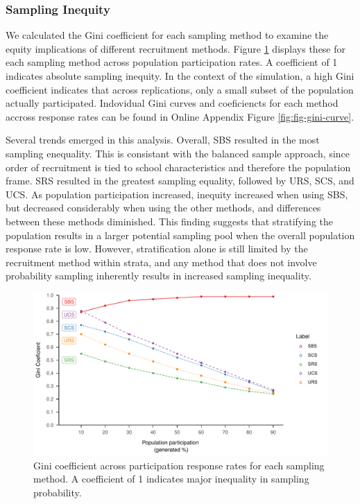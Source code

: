 \documentclass[english,man,floatsintext]{apa6}
\begin{document}
\hypertarget{sampling-inequity-1}{%
\subsubsection{Sampling Inequity}\label{sampling-inequity-1}}

We calculated the Gini coefficient for each sampling method to examine the equity implications of different recruitment methods. Figure \ref{fig:fig-gini} displays these for each sampling method across population participation rates. A coefficient of 1 indicates absolute sampling inequity. In the context of the simulation, a high Gini coefficient indicates that across replications, only a small subset of the population actually participated.  
Indovidual Gini curves and coeficiencts for each method accross response rates can be found in Online Appendix Figure \ref{fig:fig-gini-curve}.

Several trends emerged in this analysis. Overall, SBS resulted in the most sampling enequality. This is consistant with the balanced sample approach, since order of recruitment is tied to school characteristics and therefore the population frame. SRS resulted in the greatest sampling equality, followed by URS, SCS, and UCS.
As population participation increased, inequity increased when using SBS, but decreased considerably when using the other methods, and differences between these methods diminished. This finding suggests that stratifying the population results in a larger potential sampling pool when the overall population response rate is low.
However, stratification alone is still limited by the recruitment method within strata, and any method that does not involve probability sampling inherently results in increased sampling inequality.



\begin{figure}
\centering
\includegraphics{6---Paper_files/figure-latex/fig-gini-1.pdf}
\caption{\label{fig:fig-gini}Gini coefficient across participation response rates for each sampling method. A coefficient of 1 indicates major inequality in sampling probability.}
\end{figure}
\end{document}
